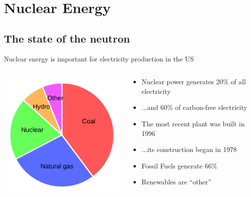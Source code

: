 \documentclass{beamer}
\begin{document}
\section{Nuclear Energy}

\subsection{The state of the neutron}

    \begin{frame}{Nuclear energy is important for electricity production in the US}

        \begin{columns}[T]

            \begin{column}{0.5\textwidth}
                \includegraphics{./img/sources.pdf}
            \end{column}

            \begin{column}{0.5\textwidth}
                \begin{itemize}
                    \item Nuclear power generates 20\% of all electricity
                    \pause
                    \item ...and 60\% of carbon-free electricity
                    \pause
                    \item The most recent plant was built in 1996
                    \pause
                    \item ...its construction began in 1978
                    \pause
                    \item Fossil Fuels generate 66\%
                    \pause
                    \item Renewables are ``other''
                \end{itemize}
            \end{column}

        \end{columns}

    \end{frame}
\end{document}
